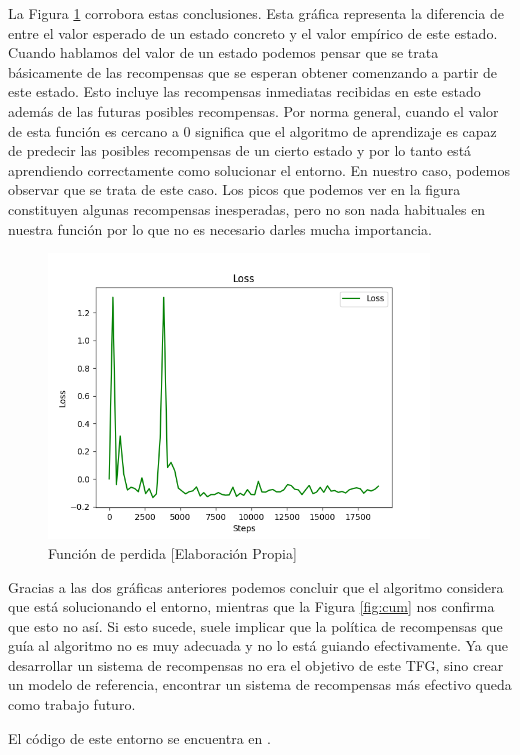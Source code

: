 La Figura \ref{fig:loss} corrobora estas conclusiones. Esta gráfica representa la diferencia de entre el valor esperado de un estado concreto y el valor empírico de este estado. Cuando hablamos del valor de un estado podemos pensar que se trata básicamente de las recompensas que se esperan obtener comenzando a partir de este estado. Esto incluye las recompensas inmediatas recibidas en este estado además de las futuras posibles recompensas. Por norma general, cuando el valor de esta función es cercano a 0 significa que el algoritmo de aprendizaje es capaz de predecir las posibles recompensas de un cierto estado y por lo tanto está aprendiendo correctamente como solucionar el entorno. En nuestro caso, podemos observar que se trata de este caso. Los picos que podemos ver en la figura constituyen algunas recompensas inesperadas, pero no son nada habituales en nuestra función por lo que no es necesario darles mucha importancia.
\begin{figure}[ht]
    \centering
    \includegraphics[width=0.9\textwidth]{img/loss.png}
    \caption{Función de perdida [Elaboración Propia]}
    \label{fig:loss}
\end{figure}

Gracias a las dos gráficas anteriores podemos concluir que el algoritmo considera que está solucionando el entorno, mientras que la Figura \ref{fig:cum} nos confirma que esto no así. Si esto sucede, suele implicar que la política de recompensas que guía al algoritmo no es muy adecuada y no lo está guiando efectivamente. Ya que desarrollar un sistema de recompensas no era el objetivo de este TFG, sino crear un modelo de referencia, encontrar un sistema de recompensas más efectivo queda como trabajo futuro.



El código de este entorno se encuentra en \cite {repo}.
 

